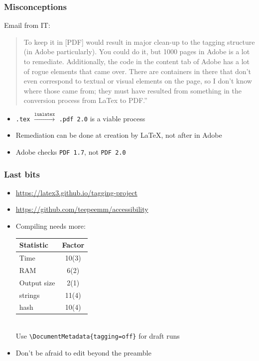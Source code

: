 \documentclass{ltx-talk}
\begin{document}
\begin{frame}
\renewcommand{\ULthickness}{2pt}
\frametitle{Misconceptions}
Email from IT:
\begin{quote}
%
To keep it in [PDF] would result in major \alert<2>{clean-up} to the tagging structure (\alert<2>{in Adobe} particularly). You could do it, but 1000 pages \alert<2>{in Adobe} is a lot \alert<2>{to remediate}. Additionally, the code in the content tab of Adobe has a lot of \alert<3>{rogue elements} that came over. There are \alert<3>{containers in there that don't even correspond to textual or visual elements on the page}, so I don't know where those came from; they must have resulted from something in the conversion process from LaTex to PDF.''
\end{quote}\bigskip
\begin{itemize}
\item \alert<2>{\texttt{.tex} $\overset{\texttt{lualatex}}{\to}$}
\alert<2>{\texttt{.pdf\,2.0}}
is  a viable process
\item<1-|alert@2> Remediation can be done at creation by \LaTeX, not after in Adobe
\item<1-|alert@3> Adobe checks \texttt{PDF\,1.7}, not \texttt{PDF\,2.0}
\end{itemize}
\end{frame}

\begin{frame*}
\frametitle{Last bits}
\begin{itemize}
\item \url{https://latex3.github.io/tagging-project}
\item \url{https://github.com/teepeemm/accessibility}
\item Compiling needs more:\medskip\\
\quad
\begin{tabular}{l @{\qquad} S[table-format=2(1),uncertainty-mode=separate]}\toprule
Statistic & Factor \\\midrule
Time & 10(3) \\
RAM & 6(2) \\
Output size & 2(1) \\
strings & 11(4)\\
hash & 10(4)\\\bottomrule
\end{tabular}
\medskip\\
Use \verb|\DocumentMetadata{tagging=off}| for draft runs
\item Don't be afraid to edit beyond the preamble
\end{itemize}
\end{frame*}
\end{document}

